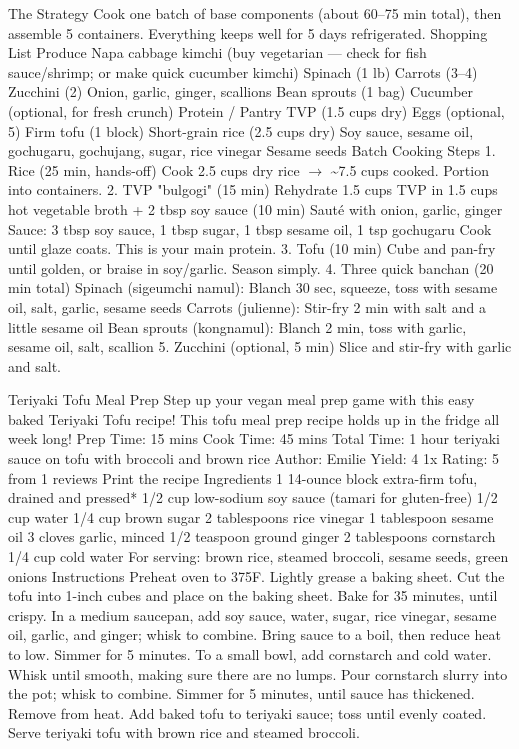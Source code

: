 The Strategy Cook one batch of base components (about 60–75 min total), then assemble 5 containers. Everything keeps well for 5 days refrigerated. Shopping List Produce Napa cabbage kimchi (buy vegetarian — check for fish sauce/shrimp; or make quick cucumber kimchi) Spinach (1 lb) Carrots (3–4) Zucchini (2) Onion, garlic, ginger, scallions Bean sprouts (1 bag) Cucumber (optional, for fresh crunch) Protein / Pantry TVP (1.5 cups dry) Eggs (optional, 5) Firm tofu (1 block) Short-grain rice (2.5 cups dry) Soy sauce, sesame oil, gochugaru, gochujang, sugar, rice vinegar Sesame seeds Batch Cooking Steps 1. Rice (25 min, hands-off) Cook 2.5 cups dry rice $\rightarrow$ \~{}7.5 cups cooked. Portion into containers. 2. TVP "bulgogi" (15 min) Rehydrate 1.5 cups TVP in 1.5 cups hot vegetable broth + 2 tbsp soy sauce (10 min) Sauté with onion, garlic, ginger Sauce: 3 tbsp soy sauce, 1 tbsp sugar, 1 tbsp sesame oil, 1 tsp gochugaru Cook until glaze coats. This is your main protein. 3. Tofu (10 min) Cube and pan-fry until golden, or braise in soy/garlic. Season simply. 4. Three quick banchan (20 min total) Spinach (sigeumchi namul): Blanch 30 sec, squeeze, toss with sesame oil, salt, garlic, sesame seeds Carrots (julienne): Stir-fry 2 min with salt and a little sesame oil Bean sprouts (kongnamul): Blanch 2 min, toss with garlic, sesame oil, salt, scallion 5. Zucchini (optional, 5 min) Slice and stir-fry with garlic and salt.
\par

Teriyaki Tofu Meal Prep Step up your vegan meal prep game with this easy baked Teriyaki Tofu recipe! This tofu meal prep recipe holds up in the fridge all week long! Prep Time: 15 mins Cook Time: 45 mins Total Time: 1 hour teriyaki sauce on tofu with broccoli and brown rice Author: Emilie Yield: 4 1x Rating: 5 from 1 reviews Print the recipe Ingredients 1 14-ounce block extra-firm tofu, drained and pressed* 1/2 cup low-sodium soy sauce (tamari for gluten-free) 1/2 cup water 1/4 cup brown sugar 2 tablespoons rice vinegar 1 tablespoon sesame oil 3 cloves garlic, minced 1/2 teaspoon ground ginger 2 tablespoons cornstarch 1/4 cup cold water For serving: brown rice, steamed broccoli, sesame seeds, green onions Instructions Preheat oven to 375\textdegree{}F. Lightly grease a baking sheet. Cut the tofu into 1-inch cubes and place on the baking sheet. Bake for 35 minutes, until crispy. In a medium saucepan, add soy sauce, water, sugar, rice vinegar, sesame oil, garlic, and ginger; whisk to combine. Bring sauce to a boil, then reduce heat to low. Simmer for 5 minutes. To a small bowl, add cornstarch and cold water. Whisk until smooth, making sure there are no lumps. Pour cornstarch slurry into the pot; whisk to combine. Simmer for 5 minutes, until sauce has thickened. Remove from heat. Add baked tofu to teriyaki sauce; toss until evenly coated. Serve teriyaki tofu with brown rice and steamed broccoli.
\par


